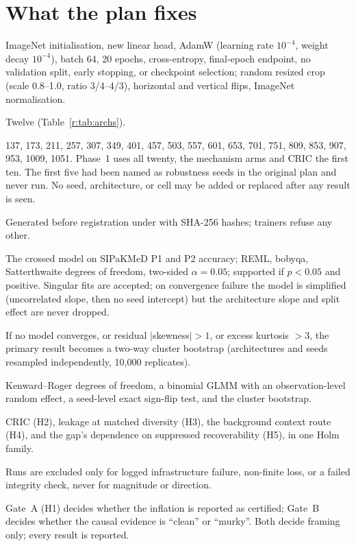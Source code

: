 \section{What the plan fixes}

\begin{description}[leftmargin=2em,style=nextline]
\item[Recipe] ImageNet initialisation, new linear head, AdamW (learning rate $10^{-4}$, weight decay $10^{-4}$), batch 64,
20 epochs, cross-entropy, final-epoch endpoint, no validation split, early stopping, or checkpoint selection; random
resized crop (scale 0.8--1.0, ratio 3/4--4/3), horizontal and vertical flips, ImageNet normalisation.
\item[Architectures] Twelve (Table~\ref{r:tab:archs}).
\item[Seeds] 137, 173, 211, 257, 307, 349, 401, 457, 503, 557, 601, 653, 701, 751, 809, 853, 907, 953, 1009, 1051. Phase~1
uses all twenty, the mechanism arms and CRIC the first ten. The first five had been named as robustness seeds in the
original plan and never run. No seed, architecture, or cell may be added or replaced after any result is seen.
\item[Splits] Generated before registration under  with SHA-256 hashes; trainers refuse any other.
\item[H1] The crossed model on SIPaKMeD P1 and P2 accuracy; REML, bobyqa, Satterthwaite degrees of freedom, two-sided
$\alpha=0.05$; supported if $p<0.05$ and positive. Singular fits are accepted; on convergence failure the model is
simplified (uncorrelated slope, then no seed intercept) but the architecture slope and split effect are never dropped.
\item[Assumption trigger] If no model converges, or residual $|$skewness$|>1$, or excess kurtosis $>3$, the primary result
becomes a two-way cluster bootstrap (architectures and seeds resampled independently, 10,000 replicates).
\item[Sensitivity] Kenward--Roger degrees of freedom, a binomial GLMM with an observation-level random effect, a seed-level
exact sign-flip test, and the cluster bootstrap.
\item[H2--H5] CRIC (H2), leakage at matched diversity (H3), the background context route (H4), and the gap's dependence on
suppressed recoverability (H5), in one Holm family.
\item[Exclusions] Runs are excluded only for logged infrastructure failure, non-finite loss, or a failed integrity check,
never for magnitude or direction.
\item[Gates] Gate~A (H1) decides whether the inflation is reported as certified; Gate~B decides whether the causal evidence
is ``clean'' or ``murky''. Both decide framing only; every result is reported.
\end{description}

